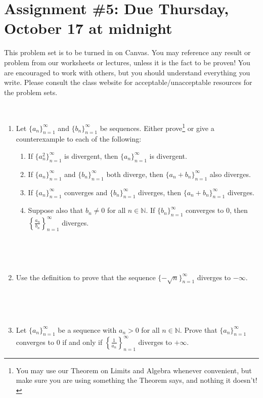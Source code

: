 \documentclass[12pt]{amsart}
\newcommand{\N}{\mathbb{N}}
\newcommand{\showsol}[1]{\def\displaysol{#1}}
\begin{document}
\showsol{1}
	
	\thispagestyle{empty}
	
	\section*{Assignment \#5: Due Thursday, October 17 at midnight}
	
	This problem set is to be turned in on Canvas. You may reference any result or problem from our worksheets or lectures, unless it is the fact to be proven! You are encouraged to work with others, but you should understand everything you write. Please consult the class website for acceptable/unacceptable resources for the problem sets.
	
	\
	
	

\begin{enumerate}

\item Let $\{a_n\}_{n=1}^\infty$ and $\{b_n\}_{n=1}^\infty$ be sequences. Either prove\footnote{You may use our Theorem on Limits and Algebra whenever convenient, but make sure you are using something the Theorem says, and nothing it doesn't!} or give a counterexample to each of the following:
\begin{enumerate}
\item If $\{a_n^2\}_{n=1}^\infty$ is divergent, then $\{a_n\}_{n=1}^\infty$ is divergent.
\item If $\{a_n\}_{n=1}^\infty$ and $\{b_n\}_{n=1}^\infty$ both diverge, then $\{a_n + b_n\}_{n=1}^\infty$ also diverges.
\item If $\{a_n\}_{n=1}^\infty$ converges and $\{b_n\}_{n=1}^\infty$ diverges, then $\{a_n + b_n\}_{n=1}^\infty$ diverges.
\item Suppose also that $b_n\neq 0$ for all $n\in \N$. If $\{b_n\}_{n=1}^\infty$ converges to $0$, then $\displaystyle \left\{\frac{a_n}{b_n}\right\}_{n=1}^\infty$ diverges.
\end{enumerate}

\

\


\item Use the definition to prove that the sequence $\{ -\sqrt{n} \}_{n=1}^\infty$ diverges to $-\infty$.


\

\


\item Let $\{a_n\}_{n=1}^\infty$ be a sequence with $a_n>0$ for all $n\in \N$. Prove that $\{a_n\}_{n=1}^\infty$ converges to $0$ if and only if $\displaystyle \left\{\frac{1}{a_n}\right \}_{n=1}^\infty$ diverges to $+\infty$. 




\end{enumerate}
\end{document}

